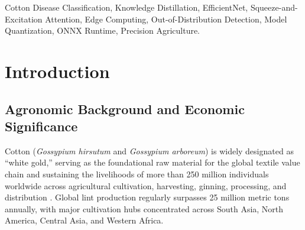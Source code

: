 \documentclass[journal,10pt,twocolumn]{IEEEtran}
\begin{document}
\begin{abstract}
To assess cross-domain distribution shift, we conduct a zero-shot cross-dataset evaluation against 1,290 external images from the National Institute of Standards and Technology (NIST) cotton collection across three overlapping classes; Swin-T maintains an external macro F1 of 79.83\% while CottonNet V2 achieves 69.94\% with $5.6\times$ fewer parameters than Swin-T. The inference engine integrates an upfront Stage-1 heuristic gatekeeper analyzing luminance, Laplacian focus variance, HSV foliage masks, and spatial texture jitter, successfully rejecting 80.0\% of out-of-distribution non-crop inputs without invoking the neural backbone. Finally, multi-precision serialization reveals that ONNX Runtime FP32 achieves 6.56~ms mean inference latency on CPU ($4.0\times$ faster than native PyTorch at 26.12~ms) with 100\% decision fidelity, while naive post-training INT8 quantization incurs catastrophic logit drift (0\% decision agreement), establishing FP32/FP16 as the mandatory production quantization target. An end-to-end Android client deployed via ONNX Runtime Mobile and Kotlin delivers complete offline diagnostic autonomy with integrated Gradient-Weighted Class Activation Mapping (Grad-CAM) visual explanations.
\end{abstract}

\begin{IEEEkeywords}
Cotton Disease Classification, Knowledge Distillation, EfficientNet, Squeeze-and-Excitation Attention, Edge Computing, Out-of-Distribution Detection, Model Quantization, ONNX Runtime, Precision Agriculture.
\end{IEEEkeywords}

\section{Introduction}

\subsection{Agronomic Background and Economic Significance}
Cotton (\textit{Gossypium hirsutum} and \textit{Gossypium arboreum}) is widely designated as ``white gold,'' serving as the foundational raw material for the global textile value chain and sustaining the livelihoods of more than 250 million individuals worldwide across agricultural cultivation, harvesting, ginning, processing, and distribution \cite{manavalan2022automated, kamilaris2018deep}. Global lint production regularly surpasses 25 million metric tons annually, with major cultivation hubs concentrated across South Asia, North America, Central Asia, and Western Africa.
\end{document}
